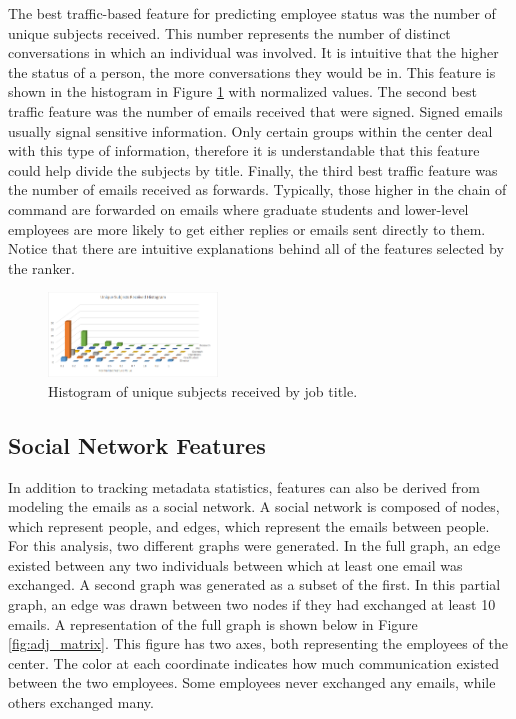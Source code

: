 \documentclass{article}
\begin{document}
\par
The best traffic-based feature for predicting employee status was the number of unique subjects received.  This number represents the number of distinct conversations in which an individual was involved.  It is intuitive that the higher the status of a person, the more conversations they would be in.  This feature is shown in the histogram in Figure \ref{fig:traffic_ex_hist} with normalized values.  The second best traffic feature was the number of emails received that were signed.  Signed emails usually signal sensitive information.  Only certain groups within the center deal with this type of information, therefore it is understandable that this feature could help divide the subjects by title.  Finally, the third best traffic feature was the number of emails received as forwards.  Typically, those higher in the chain of command are forwarded on emails where graduate students and lower-level employees are more likely to get either replies or emails sent directly to them.  Notice that there are intuitive explanations behind all of the features selected by the ranker.


\begin{figure}[H]
    \centering
        \includegraphics[width=0.4\textwidth]{Unique_subjects_rec_hist}
        \caption{Histogram of unique subjects received by job title.}
        \label{fig:traffic_ex_hist}
\end{figure}


\subsection{Social Network Features}
In addition to tracking metadata statistics, features can also be derived from modeling the emails as a social network.  A social network is composed of nodes, which represent people, and edges, which represent the emails between people.  For this analysis, two different graphs were generated.  In the full graph, an edge existed between any two individuals between which at least one email was exchanged.  A second graph was generated as a subset of the first.  In this partial graph, an edge was drawn between two nodes if they had exchanged at least 10 emails.  A representation of the full graph is shown below in Figure \ref{fig:adj_matrix}.  This figure has two axes, both representing the employees of the center.  The color at each coordinate indicates how much communication existed between the two employees.  Some employees never exchanged any emails, while others exchanged many.
\end{document}
